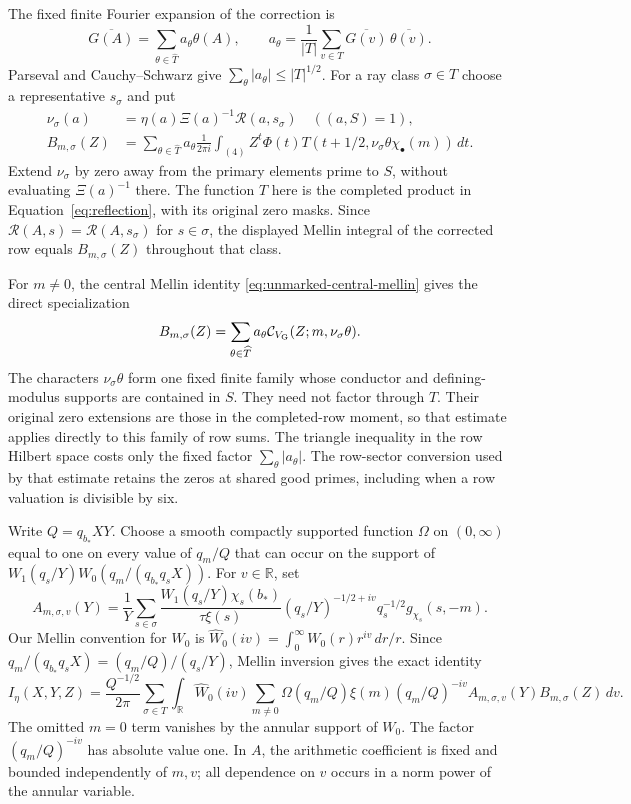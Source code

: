 The fixed finite Fourier expansion of the correction is
\[
 \overline{G(A)}=\sum_{\theta\in\widehat T}a_\theta\theta(A),
 \qquad
 a_\theta=\frac1{|T|}\sum_{v\in T}
                 \overline{G(v)}\,\overline{\theta(v)}.
\]
Parseval and Cauchy--Schwarz give
$\sum_\theta|a_\theta|\le |T|^{1/2}$.  For a ray class
$\sigma\in T$ choose a representative $s_\sigma$ and put
\[
 \begin{aligned}
 \nu_\sigma(a)&=\eta(a)\Xi(a)^{-1}\mathcal R(a,s_\sigma)
       \quad ((a,S)=1),\\
 B_{m,\sigma}(Z)&=\sum_{\theta\in\widehat T}a_\theta
 \frac1{2\pi i}\int_{(4)}Z^t\Phi(t)
       T(t+1/2,\nu_\sigma\theta\chi_\bullet(m))\,dt.
 \end{aligned}
\]
Extend $\nu_\sigma$ by zero away from the primary elements prime to $S$, without
evaluating $\Xi(a)^{-1}$ there.  The function $T$ here is the completed
product in
Equation~\eqref{eq:reflection}, with its original zero masks.
Since $\mathcal R(A,s)=\mathcal R(A,s_\sigma)$ for $s\in\sigma$,
the displayed Mellin integral of the corrected row equals
$B_{m,\sigma}(Z)$ throughout that class.

For $m\ne0$, the central Mellin identity
\eqref{eq:unmarked-central-mellin} gives the direct specialization
\[
 B_{m,\sigma}(Z)=\sum_{\theta\in\widehat T}a_\theta
       \mathcal C_{V_{\rm G}}(Z;m,\nu_\sigma\theta).
\]
The characters $\nu_\sigma\theta$ form one fixed finite family whose
conductor and defining-modulus supports are contained in $S$. They need
not factor through $T$. Their original zero extensions are those in the
completed-row moment, so that estimate applies directly to this family
of row sums. The triangle inequality in the row Hilbert space costs only
the fixed factor $\sum_\theta|a_\theta|$. The row-sector conversion used
by that estimate retains the zeros at shared good primes, including when
a row valuation is divisible by six.

Write $Q=q_{b_*}XY$.  Choose a smooth compactly supported function
$\Omega$ on $(0,\infty)$ equal to one on every value of $q_m/Q$
that can occur on the support of
$W_1(q_s/Y)W_0(q_m/(q_{b_*}q_sX))$.  For $v\in\mathbb R$, set
\[
 A_{m,\sigma,v}(Y)=\frac1Y\sum_{s\in\sigma}
 \frac{W_1(q_s/Y)\chi_s(b_*)}{\tau\xi(s)}
 (q_s/Y)^{-1/2+iv}q_s^{-1/2}g_{\chi_s}(s,-m).
\]
Our Mellin convention for $W_0$ is
$\widehat W_0(iv)=\int_0^\infty W_0(r)r^{iv}\,dr/r$.
Since
$q_m/(q_{b_*}q_sX)=(q_m/Q)/(q_s/Y)$, Mellin inversion gives the
exact identity
\begin{equation}\label{eq:low-separated}
 I_\eta(X,Y,Z)=\frac{Q^{-1/2}}{2\pi}
 \sum_{\sigma\in T}\int_{\mathbb R}\widehat W_0(iv)
 \sum_{m\ne0}\Omega(q_m/Q)\xi(m)(q_m/Q)^{-iv}
                 A_{m,\sigma,v}(Y)B_{m,\sigma}(Z)\,dv.
\end{equation}
The omitted $m=0$ term vanishes by the annular support of $W_0$.
The factor $(q_m/Q)^{-iv}$ has absolute value one.  In $A$, the
arithmetic coefficient is fixed and bounded independently of $m,v$;
all dependence on $v$ occurs in a norm power of the annular variable.

